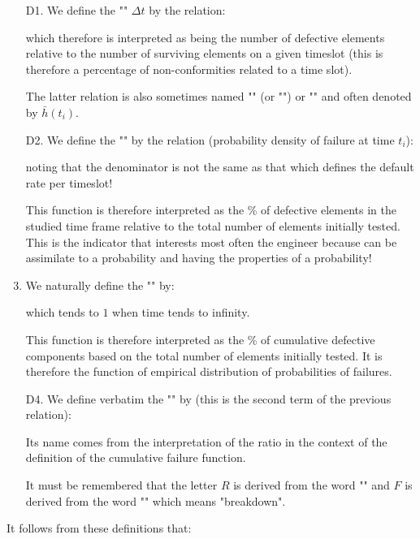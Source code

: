 	\begin{enumerate}
		\item[D1.] We define the "" $\Delta t$ by the relation:
		
		which therefore is interpreted as being the number of defective elements relative to the number of surviving elements on a given timeslot (this is therefore a percentage of non-conformities related to a time slot).
		
		The latter relation is also sometimes named "" (or "") or "" and often denoted by $\bar{h}(t_i)$.
		
		\item[D2.] We define the "" by the relation (probability density of failure at time $t_i$):
		
		noting that the denominator is not the same as that which defines the default rate per timeslot!
		
		This function is therefore interpreted as the \% of defective elements in the studied  time frame relative to the total number of elements initially tested. This is the indicator that interests most often the engineer because can be assimilate to a probability and having the properties of a probability!
		
		\item We naturally define the "" by:
		
		which tends to $1$ when time tends to infinity.
		
		This function is therefore interpreted as the \% of cumulative defective components based on the total number of elements initially tested. It is therefore the function of empirical distribution of probabilities of failures.
		
		\item[D4.] We define verbatim the "" by (this is the second term of the previous relation):
		
		Its name comes from the interpretation of the ratio in the context of the definition of the cumulative failure function.
		
		It must be remembered that the letter $R$ is derived from the word "" and $F$ is derived from the word "" which means "breakdown".
	\end{enumerate}
	It follows from these definitions that:
	
